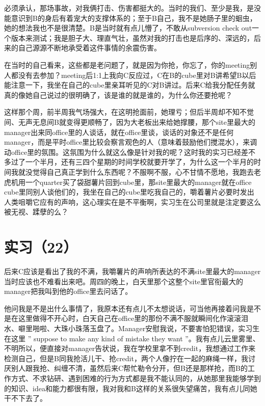 \documentclass[12pt]{book}
\begin{document}
必须承认，那场事故，对我俩打击、伤害都挺大的。当时的我们、至少是我，是没能意识到B的身后有着宠大的支撑体系的；至于B自己，我不是她肠子里的蛔虫，她的想法我也不是很清楚。B是当时就有点儿懵了，不敢从subversion check out一个版本来测试；我是胆子大、理直气壮，虽然对我的打击也是后序的、深远的，后来的自己源源不断地承受着这件事情的余震伤害。

在当时的自己看来，这些都是老问题了，就是因为你抢，你忘了，你的meeting别人都没有去参加？meeting后1:1上我向C反应过，C在B的cube里对B讲希望B以后能注意一下，我坐在自己的cube里亲耳听见的C对B讲过。后来C给我分配任务就真的像她自己说过的很明确了，该是谁的就是谁的，为什么你还要抢呢？

这样那个周，前半周我气场强大，在这明抢面前，她理亏；但后半周却不知不觉间、无声无息间B就变得更顺畅了，因为大老板出来给她撑腰，那个site里最大的manager出来同office里的人谈话，就在office里谈，谈话的对象还不是任何manager，而是平时office里比较会察言观色的人（意味着鼓励他们搅混水），来调动office里的氛围。这氛围为什么就这么像是针对我的呢？这时我的实习已经差不多过了一个半月，还有三四个星期的时间学校就要开学了，为什么这一个半月的时间我就没觉得自己真正学到什么东西呢？不服啊不服，心不甘情不愿地，我跑去老虎机用一个quarter买了袋甜薯片回到cube里，那site里最大的manager就在office cube里同别人谈他们的，我坐在自己的cube里吃我自己的，嚼着薯片必要时发出人类咀嚼它应有的声响，这心理实在是不平衡啊，实习生在公司里就是注定要这么被无视、蹂孽的么？

\section{实习（22）}
\label{sec-5-25}

后来C应该是看出了我的不满，我嚼薯片的声响所表达的不满site里最大的manager当时应该也不难看出来吧。周四的晚上，白天里那个这整个site里官衔最大的manager把我叫到他的office里去问话了。

他问我是不是出什么事情了，我原本还有点儿不太想说话，可当他再接着问我是不是在这里做得不开心时，白天自己在office里的那份不满不服就瞬间化作滚滚泪水、噼里啪啦、大珠小珠落玉盘了。Manager安慰我说，不要害怕犯错误，实习生在这里 ” suppose to make any kind of mistake they want ”。我有点儿云里雾里、不明所以，便直接对manager告状说，我在学校里拿不到credit，我想通过工作来检测自己，但是B同我抢活儿干、抢credit，两个人像拧在一起的麻绳一样，我讨厌别人跟我抢、纠缠不清，虽然后来C帮忙勒令分开，但B还是那样抢，而B的工作方式、不求钻研、遇到困难的行为方式都是我不能认同的，从她那里我能够学到的知识、idea和能力都很有限，我对我和B这样的关系很失望痛苦，我有点儿同她干不下去了。
\end{document}
